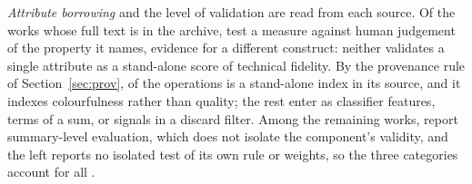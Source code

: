 \emph{Attribute borrowing} and the level of validation are read from each source. Of the
\valComPdf{} works whose full text is in the archive, \valPropriedade{} test a measure
against human judgement of the property it names, evidence for a different construct: neither validates a single attribute as a stand-alone
score of technical fidelity. By the provenance rule of Section~\ref{sec:prov},
\autAutonomas{} of the \autVerificadas{} operations is a stand-alone index in its
source, and it indexes colourfulness rather than quality; the rest enter as classifier
features, terms of a sum, or signals in a discard filter. Among the remaining works,
\valSoResumo{} report summary-level evaluation, which does not isolate the component's
validity, and the \valSemTeste{} left reports no isolated test of its own rule or
weights, so the three categories account for all \valComPdf{}.



